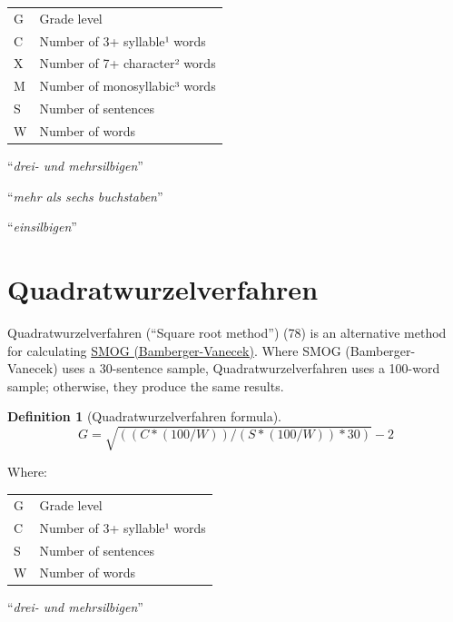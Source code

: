 \documentclass[
]{book}
\theoremstyle{definition}
\newtheorem{definition}{Definition}[chapter]
\theoremstyle{definition}
\theoremstyle{definition}
\theoremstyle{definition}
\theoremstyle{remark}
\begin{document}
\begin{table}
\centering
\begin{threeparttable}
\begin{tabular}[t]{ll}
\toprule
G & Grade level\\
C & Number of 3+ syllable¹ words\\
X & Number of 7+ character² words\\
M & Number of monosyllabic³ words\\
S & Number of sentences\\
W & Number of words\\
\bottomrule
\end{tabular}
\begin{tablenotes}
\item[1] “\textit{drei- und mehrsilbigen}”
\item[2] “\textit{mehr als sechs buchstaben}”
\item[3] “\textit{einsilbigen}”
\end{tablenotes}
\end{threeparttable}
\end{table}

\newpage

\hypertarget{qu-bamberger-vanecek}{%
\section{\texorpdfstring{Quadratwurzelverfahren}{Quadratwurzelverfahren}}\label{qu-bamberger-vanecek}}

Quadratwurzelverfahren (``Square root method'') (78) is an alternative method for calculating \protect\hyperlink{smog-bamberger-vanecek}{SMOG (Bamberger-Vanecek)}. Where SMOG (Bamberger-Vanecek) uses a 30-sentence sample, Quadratwurzelverfahren uses a 100-word sample; otherwise, they produce the same results.

\begin{definition}[Quadratwurzelverfahren formula]
\protect\hypertarget{def:qu}{}{\label{def:qu} {} }\[
G = \sqrt{((C*(100/W))/(S*(100/W))*30)} - 2
\]
\end{definition}

Where:

\begin{table}
\centering
\begin{threeparttable}
\begin{tabular}[t]{ll}
\toprule
G & Grade level\\
C & Number of 3+ syllable¹ words\\
S & Number of sentences\\
W & Number of words\\
\bottomrule
\end{tabular}
\begin{tablenotes}
\item[1] “\textit{drei- und mehrsilbigen}”
\end{tablenotes}
\end{threeparttable}
\end{table}
\end{document}

